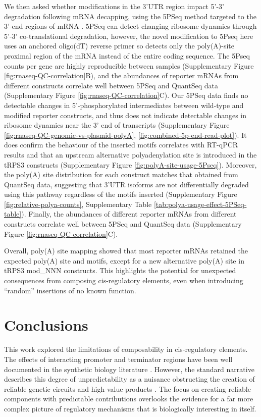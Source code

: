 \documentclass[../main.tex]{subfiles}
\begin{document}
We then asked whether modifications in the 3'UTR region impact 5'-3' degradation following mRNA decapping, using the 5PSeq method targeted to the 3'-end regions of mRNA \parencite{Pelechano2016}.
5PSeq can detect changing ribosome dynamics through 5'-3' co-translational degradation, however, the novel modification to 5Pseq here uses an anchored oligo(dT) reverse primer so detects only the poly(A)-site proximal region of the mRNA instead of the entire coding sequence.
The 5Pseq counts per gene are highly reproducible between samples (Supplementary Figure \ref{fig:rnaseq-QC-correlation}B), and the abundances of reporter mRNAs from different constructs correlate well between 5PSeq and QuantSeq data (Supplementary Figure \ref{fig:rnaseq-QC-correlation}C).
Our 5PSeq data finds no detectable changes in 5'-phosphorylated intermediates between wild-type and modified reporter constructs, and thus does not indicate detectable changes in ribosome dynamics near the 3' end of transcripts (Supplementary Figure \ref{fig:rnaseq-QC-genomic-vs-plasmid-polyA}, \ref{fig:combined-5p-end-read-plot}).
It does confirm the behaviour of the inserted motifs correlates with  RT-qPCR results and that an upstream alternative polyadenylation site is introduced in the tRPS3 constructs (Supplementary Figure \ref{fig:polyA-site-usage-5Pseq}).
Moreover, the poly(A) site distribution for each construct matches that obtained from QuantSeq data, suggesting that 3'UTR isoforms are not differentially degraded using this pathway regardless of the motifs inserted (Supplementary Figure \ref{fig:relative-polya-counts}, Supplementary Table \ref{tab:polya-usage-effect-5PSeq-table}).
Finally, the abundances of different reporter mRNAs from different constructs correlate well between
5PSeq and QuantSeq data (Supplementary Figure \ref{fig:rnaseq-QC-correlation}C).

Overall, poly(A) site mapping showed that most reporter mRNAs retained the expected poly(A) site and motifs, except for a new alternative poly(A) site in tRPS3 mod\_NNN constructs.
This highlights the potential for unexpected consequences from composing cis-regulatory elements, even when introducing ``random'' insertions of no known function.


\section{Conclusions}

This work explored the limitations of composability in cis-regulatory elements. 
The effects of interacting promoter and terminator regions have been well documented in the synthetic biology literature \parencite{Ito2013, Dhillon2020}. 
However, the standard narrative describes this degree of unpredictability as a nuisance obstructing the creation of reliable genetic circuits and high-value products \parencite{Kittleson2012}. 
The focus on creating reliable components with predictable contributions overlooks the evidence for a far more complex picture of regulatory mechanisms that is biologically interesting in itself. 
\end{document}

